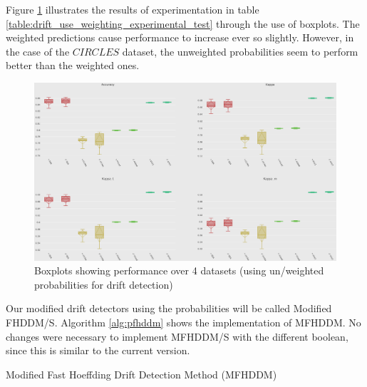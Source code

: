 Figure \ref{fig:boxplot_params_use_w} illustrates the results of experimentation in table \ref{table:drift_use_weighting_experimental_test} through the use of boxplots. The weighted predictions cause performance to increase ever so slightly. However, in the case of the $CIRCLES$ dataset, the unweighted probabilities seem to perform better than the weighted ones.

\begin{figure}
  \includegraphics[width=\linewidth]{./images/chapter3/boxplot_params_use_w}
\caption{\label{fig:boxplot_params_use_w}Boxplots showing performance over 4 datasets (using un/weighted probabilities for drift detection)}
\end{figure}

Our modified drift detectors using the probabilities will be called Modified FHDDM/S.
Algorithm \ref{alg:pfhddm} shows the implementation of MFHDDM. No changes were necessary to implement MFHDDM/S with the different boolean, since this is similar to the current version.

\begin{algorithm}[h]
\caption{Modified Fast Hoeffding Drift Detection Method (MFHDDM)\label{alg:pfhddm}}


\end{algorithm}

